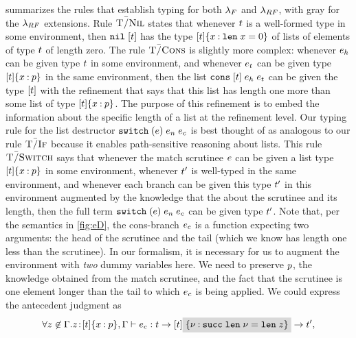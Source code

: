  summarizes
the rules that establish typing for both $\lambda_{F}$ and
$\lambda_{RF}$, with gray %
for the $\lambda_{RF}$ extensions.
%
Rule $\textsc{T\=/Nil}$ states that whenever $t$ is a well-formed
type in some environment, then  $\texttt{nil}\;[{t}]$ has the type
${{[t]}\{x \mathbin{:} \mathtt{len}\; x = 0\}}$ of lists of elements
of type $t$ of length zero.
%
The rule $\textsc{T\=/Cons}$ is slightly more complex: whenever $e_h$
can be given type $t$ in some environment, and whenever
$e_t$ can be given type
${{[t]}\{x \mathbin{:} p\}}$ in the same environment,
then the list $\texttt{cons}\;[{t}]\;{e_h}\;{e_t}$ can be given
the type $[t]$ with the refinement that says that
this list has length one more than some list of type
${{[t]}\{x \mathbin{:} p\}}$.
%
The purpose of this refinement is to embed the information about
the specific length of a list at the refinement level.
%
Our typing rule for the list destructor 
${{\texttt{switch}}}\;({e})\;{e_n}\;{e_c}$ is 
best thought of as analogous to our rule $\textsc{T\=/If}$
because it enables path-sensitive reasoning about lists.
%
This rule $\textsc{T\=/Switch}$ says that whenever the match scrutinee
$e$ can be given a list type 
${{[t]}\{x \mathbin{:} p\}}$ in some environment,
whenever $t'$ is well-typed in the same environment,
and whenever each branch can be given this type
$t'$ in this environment augmented by the knowledge 
that the about the scrutinee and its length, then the full
term ${{\texttt{switch}}}\;({e})\;{e_n}\;{e_c}$ can be given type
$t'$. 
%
Note that, per the semantics in \ref{fig:eD}, the cons-branch
$e_c$ is a function expecting two arguments: the head
of the scrutinee and the tail (which we know has length
one less than the scrutinee).
%
In our formalism, it is necessary for us to augment the 
environment with \emph{two} dummy variables here. We need
to preserve $p$,
the knowledge obtained from the match scrutinee,
and the fact that the scrutinee is one element longer than
the tail to which $e_c$ is being applied.
%
We could express the antecedent judgment as
\begin{equation}
  \label{badswitch}
\forall\notmem{z}{\tcenv}. 
  \hastype{\bind{z}{\breft{\tlist{\stype}}{x}{p},\tcenv}}
     {\sexpr_c}
     {\funcftype{\stype}{\funcftype{\tlist{\stype}\greybox{\breft{}{\vv}{\suc \len \vv = \len z}}}{\stype'}}},
\end{equation}
